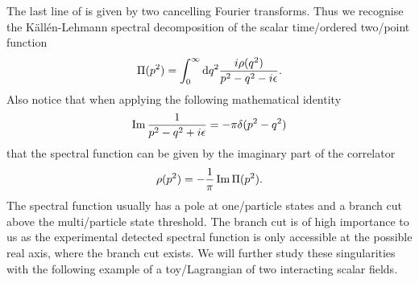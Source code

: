 \documentclass[../../index.tex]{subfiles}
\begin{document}
The last line of is given by two cancelling Fourier transforms. Thus we
recognise the Källén-Lehmann spectral decomposition of the scalar time\-/ordered
two\-/point function
\begin{equation}
  \Pi(p^2) = \int_0^\infty \dif q^2 \frac{i\rho(q^2)}{p^2-q^2-i\epsilon}.
\end{equation}
Also notice that when applying the following mathematical identity
\begin{equation}
  \label{eq:cuttingRules}
  \operatorname{Im} \frac{1}{p^2-q^2+i\epsilon} = -\pi \delta(p^2-q^2)
\end{equation}
that the spectral function can be given by the imaginary part of the correlator
\begin{equation}
  \rho(p^2) = -\frac{1}{\pi} \operatorname{Im}\Pi(p^2).
\end{equation}
The spectral function usually has a pole at one\-/particle states and a branch
cut above the multi\-/particle state threshold. The branch cut is of high
importance to us as the experimental detected spectral function is only
accessible at the possible real axis, where the branch cut exists. We will
further study these singularities with the following example of a
toy\-/Lagrangian of two interacting scalar fields.
\end{document}
